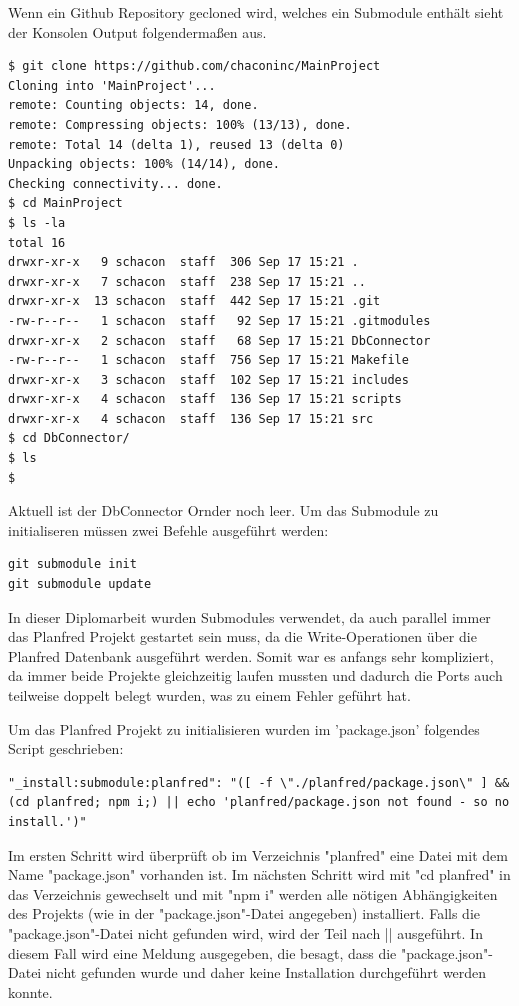 Wenn ein Github Repository gecloned wird, welches ein Submodule enthält sieht der Konsolen Output folgendermaßen aus. 
\begin{lstlisting}
$ git clone https://github.com/chaconinc/MainProject
Cloning into 'MainProject'...
remote: Counting objects: 14, done.
remote: Compressing objects: 100% (13/13), done.
remote: Total 14 (delta 1), reused 13 (delta 0)
Unpacking objects: 100% (14/14), done.
Checking connectivity... done.
$ cd MainProject
$ ls -la
total 16
drwxr-xr-x   9 schacon  staff  306 Sep 17 15:21 .
drwxr-xr-x   7 schacon  staff  238 Sep 17 15:21 ..
drwxr-xr-x  13 schacon  staff  442 Sep 17 15:21 .git
-rw-r--r--   1 schacon  staff   92 Sep 17 15:21 .gitmodules
drwxr-xr-x   2 schacon  staff   68 Sep 17 15:21 DbConnector
-rw-r--r--   1 schacon  staff  756 Sep 17 15:21 Makefile
drwxr-xr-x   3 schacon  staff  102 Sep 17 15:21 includes
drwxr-xr-x   4 schacon  staff  136 Sep 17 15:21 scripts
drwxr-xr-x   4 schacon  staff  136 Sep 17 15:21 src
$ cd DbConnector/
$ ls
$
\end{lstlisting}

Aktuell ist der DbConnector Ornder noch leer. Um das Submodule zu initialiseren müssen zwei Befehle ausgeführt werden:

\begin{lstlisting}
git submodule init
git submodule update
\end{lstlisting}

In dieser Diplomarbeit wurden Submodules verwendet, da auch parallel immer das Planfred Projekt gestartet sein muss, da die Write-Operationen über die Planfred Datenbank ausgeführt werden. Somit war es anfangs sehr kompliziert, da immer beide Projekte gleichzeitig laufen mussten und dadurch die Ports auch teilweise doppelt belegt wurden, was zu einem Fehler geführt hat.

Um das Planfred Projekt zu initialisieren wurden im 'package.json' folgendes Script geschrieben:

\begin{lstlisting}
"_install:submodule:planfred": "([ -f \"./planfred/package.json\" ] && (cd planfred; npm i;) || echo 'planfred/package.json not found - so no install.')"
\end{lstlisting}

Im ersten Schritt wird überprüft ob im Verzeichnis "planfred" eine Datei mit dem Name "package.json" vorhanden ist. Im nächsten Schritt wird mit "cd planfred" in das Verzeichnis gewechselt und mit "npm i" werden alle nötigen Abhängigkeiten des Projekts (wie in der "package.json"-Datei angegeben) installiert. Falls die "package.json"-Datei nicht gefunden wird, wird der Teil nach || ausgeführt. In diesem Fall wird eine Meldung ausgegeben, die besagt, dass die "package.json"-Datei nicht gefunden wurde und daher keine Installation durchgeführt werden konnte.


